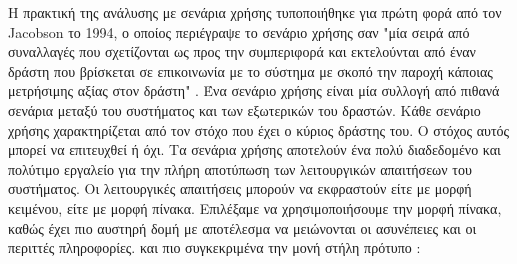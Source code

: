 		Η πρακτική της ανάλυσης με σενάρια χρήσης τυποποιήθηκε για πρώτη φορά από τον Jacobson το 1994, ο οποίος περιέγραψε το σενάριο χρήσης σαν "μία σειρά από συναλλαγές που σχετίζονται ως προς την συμπεριφορά και εκτελούνται από έναν δράστη που βρίσκεται σε επικοινωνία με το σύστημα με σκοπό την παροχή κάποιας μετρήσιμης αξίας στον δράστη" \cite{Jacobson} . Ένα σενάριο χρήσης είναι μία συλλογή από πιθανά σενάρια μεταξύ του συστήματος και των εξωτερικών του δραστών. Κάθε σενάριο χρήσης χαρακτηρίζεται από τον στόχο που έχει ο κύριος δράστης του. Ο στόχος αυτός μπορεί να επιτευχθεί ή όχι. Τα σενάρια χρήσης αποτελούν ένα πολύ διαδεδομένο και πολύτιμο εργαλείο για την πλήρη αποτύπωση των λειτουργικών απαιτήσεων του συστήματος. Οι λειτουργικές απαιτήσεις μπορούν να εκφραστούν είτε με μορφή κειμένου, είτε με μορφή πίνακα. Επιλέξαμε να χρησιμοποιήσουμε την μορφή πίνακα, καθώς έχει πιο αυστηρή δομή με αποτέλεσμα να μειώνονται οι ασυνέπειες και οι περιττές πληροφορίες. \cite{Cockburn2000} και πιο συγκεκριμένα την μονή στήλη πρότυπο \cite{Cockburn2000} :
 
